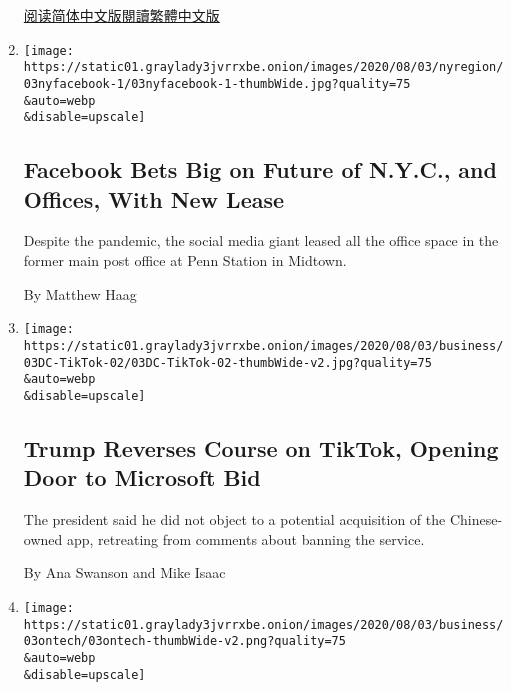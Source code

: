 \begin{enumerate}
  \href{https://cn.nytimes3xbfgragh.onion/business/20200804/trump-tiktok-china-business/}{阅读简体中文版}\href{https://cn.nytimes3xbfgragh.onion/business/20200804/trump-tiktok-china-business/zh-hant/}{閱讀繁體中文版}
\item
  \href{/2020/08/03/nyregion/facebook-nyc-office-farley-building.html}{}

  \texttt{[image: https://static01.graylady3jvrrxbe.onion/images/2020/08/03/nyregion/03nyfacebook-1/03nyfacebook-1-thumbWide.jpg?quality=75\\\&auto=webp\\\&disable=upscale]}

  \hypertarget{facebook-bets-big-on-future-of-nyc-and-offices-with-new-lease}{%
  \subsection{Facebook Bets Big on Future of N.Y.C., and Offices, With
  New
  Lease}\label{facebook-bets-big-on-future-of-nyc-and-offices-with-new-lease}}

  Despite the pandemic, the social media giant leased all the office
  space in the former main post office at Penn Station in Midtown.

  By Matthew Haag
\item
  \href{/2020/08/03/technology/trump-tiktok-microsoft.html}{}

  \texttt{[image: https://static01.graylady3jvrrxbe.onion/images/2020/08/03/business/03DC-TikTok-02/03DC-TikTok-02-thumbWide-v2.jpg?quality=75\\\&auto=webp\\\&disable=upscale]}

  \hypertarget{trump-reverses-course-on-tiktok-opening-door-to-microsoft-bid}{%
  \subsection{Trump Reverses Course on TikTok, Opening Door to Microsoft
  Bid}\label{trump-reverses-course-on-tiktok-opening-door-to-microsoft-bid}}

  The president said he did not object to a potential acquisition of the
  Chinese-owned app, retreating from comments about banning the service.

  By Ana Swanson and Mike Isaac
\item
  \href{/2020/08/03/technology/tiktok-microsoft.html}{}

  \texttt{[image: https://static01.graylady3jvrrxbe.onion/images/2020/08/03/business/03ontech/03ontech-thumbWide-v2.png?quality=75\\\&auto=webp\\\&disable=upscale]}

  \hypertarget{on-tech}{%
}
\end{enumerate}
